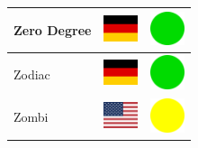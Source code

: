 \documentclass[12pt, a4paper, twoside]{report}
\begin{document}
\begin{center}
\begin{longtable}{|p{5cm}|p{2cm}|p{2cm}|}
 Zero Degree                                                & \includegraphics[width=1cm]{../4x3/de} &   \includegraphics[width=1cm]{../likes/y} \\ \hline
 Zodiac                                                     & \includegraphics[width=1cm]{../4x3/de} &   \includegraphics[width=1cm]{../likes/y} \\ \hline
 Zombi                                                      & \includegraphics[width=1cm]{../4x3/us} &   \includegraphics[width=1cm]{../likes/m} \\ \hline
		\end{longtable}
	\end{center}
\end{document}

